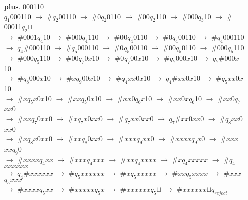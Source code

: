 \documentclass[12pt]{letter}
\begin{document}
\begin{enumerate}
\begin{enumerate}
\begin{enumerate}
	\item[\textbf{plus}.] 000110 \\

		$q_1$000110 $\rightarrow$ $\#$$q_2$00110 $\rightarrow$ $\#$0$q_2$0110 $\rightarrow$ $\#$00$q_2$110 $\rightarrow$ $\#$000$q_3$10 $\rightarrow$ $\#$00011$q_2$$\sqcup$ \\
		$\rightarrow$ $\#$0001$q_4$10 $\rightarrow$ $\#$000$q_4$110 $\rightarrow$ $\#$00$q_4$0110 $\rightarrow$ $\#$0$q_4$00110 $\rightarrow$ $\#$$q_4$000110 \\
		$\rightarrow$ $q_4$$\#$000110 $\rightarrow$ $\#$$q_5$000110 $\rightarrow$ $\#$0$q_5$00110 $\rightarrow$ $\#$00$q_5$0110 $\rightarrow$ $\#$000$q_5$110 \\
		$\rightarrow$ $\#$000$q_5$110 $\rightarrow$ $\#$00$q_7$0$x$10 $\rightarrow$ $\#$0$q_7$00$x$10 $\rightarrow$ $\#$$q_7$000$x$10 $\rightarrow$ $q_7$$\#$000$x$10 \\
		$\rightarrow$ $\#$$q_8$000$x$10 $\rightarrow$ $\#$$x$$q_9$00$x$10 $\rightarrow$ $\#$$q_4$$xx$0$x$10 $\rightarrow$ $q_4$$\#$$xx$0$x$10 $\rightarrow$ $\#$$q_5$$xx$0$x$10 \\
		$\rightarrow$ $\#$$x$$q_5$$x$0$x$10 $\rightarrow$ $\#$$xx$$q_5$0$x$10 $\rightarrow$ $\#$$xx$0$q_6$$x$10 $\rightarrow$ $\#$$xx$0$x$$q_6$10 $\rightarrow$ $\#$$xx$0$q_7$$xx$0 \\
		$\rightarrow$ $\#$$xx$$q_7$0$xx$0 $\rightarrow$ $\#$$x$$q_7$$x$0$xx$0 $\rightarrow$ $\#$$q_7$$xx$0$xx$0 $\rightarrow$ $q_7$$\#$$xx$0$xx$0 $\rightarrow$ $\#$$q_8$$xx$0$xx$0 \\
		$\rightarrow$ $\#$$x$$q_8$$x$0$xx$0 $\rightarrow$ $\#$$xx$$q_8$0$xx$0 $\rightarrow$ $\#$$xxx$$q_9$$xx$0 $\rightarrow$ $\#$$xxx$$x$$q_9$$x$0 $\rightarrow$ $\#$$xxx$$xx$$q_9$0 \\
		$\rightarrow$ $\#$$xxxx$$q_4$$xx$ $\rightarrow$ $\#$$xxx$$q_4$$x$$xx$ $\rightarrow$ $\#$$xx$$q_4$$xxxx$ $\rightarrow$ $\#$$x$$q_4$$xxxxx$ $\rightarrow$ $\#$$q_4$$xxxxxx$ \\
		$\rightarrow$ $q_4$$\#$$xxxxxx$ $\rightarrow$ $\#$$q_5$$xxxxxx$ $\rightarrow$ $\#$$x$$q_5$$xxxxx$ $\rightarrow$ $\#$$xx$$q_5$$xxxx$ $\rightarrow$ $\#$$xxx$$q_5$$xxx$ \\
		$\rightarrow$ $\#$$xxxx$$q_5$$xx$ $\rightarrow$ $\#$$xxxxx$$q_5$$x$  $\rightarrow$ $\#$$xxxxxx$$q_5$$\sqcup$ $\rightarrow$ $\#$$xxxxxx$$\sqcup$$q_{reject}$ 

	\end{enumerate}


\end{enumerate}
\end{enumerate}
\end{document}

